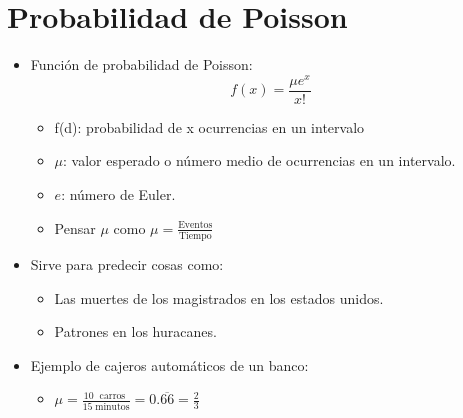 \section{Probabilidad de Poisson}
\begin{itemize}
    \item Función de probabilidad de Poisson:
        \[
          f(x)= \frac{\mu e^x}{x!} 
        \]
        \begin{itemize}
            \item f(d): probabilidad de x ocurrencias en un intervalo 
            \item $\mu$: valor esperado o número medio de ocurrencias en un intervalo.
            \item $e$: número de Euler.
            \item Pensar $\mu$ como $\mu = \frac{\text{Eventos}}{\text{Tiempo}} $
        \end{itemize}
    
    \item Sirve para predecir cosas como:
        \begin{itemize}
            \item Las muertes de los magistrados en los estados unidos.
            \item Patrones en los huracanes.
        \end{itemize}

    \item Ejemplo de cajeros automáticos de un banco:  
        \begin{itemize}
            \item $\mu = \frac{10 \; \text{ carros }}{15 \;\text{minutos}} = 0.\overline{66} = \frac{2}{3} $
        \end{itemize}
\end{itemize}


